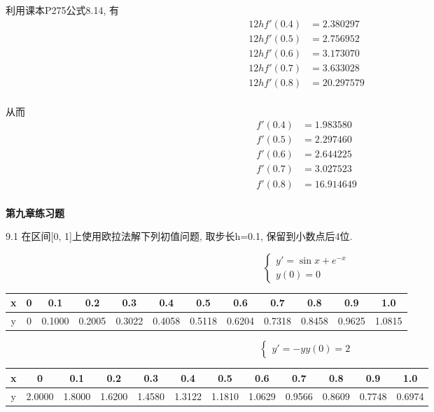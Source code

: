 \documentclass[a4paper, 10pt]{article}
\begin{document}
\begin{CJK}{UTF8}{gbsn}
利用课本P275公式8.14, 有 \\

\begin{align*}
	12hf'(0.4) & =  2.380297 \\
	12hf'(0.5) & =  2.756952 \\
	12hf'(0.6) & =  3.173070 \\
	12hf'(0.7) & =  3.633028 \\
	12hf'(0.8) & = 20.297579 \\
\end{align*}

从而 \\

\begin{align*}
	f'(0.4) & =  1.983580 \\
	f'(0.5) & =  2.297460 \\
	f'(0.6) & =  2.644225 \\
	f'(0.7) & =  3.027523 \\
	f'(0.8) & = 16.914649 \\
\end{align*}

\textbf{第九章练习题}

9.1
在区间[0, 1]上使用欧拉法解下列初值问题, 取步长h=0.1, 保留到小数点后4位.

\begin{equation*}
	\begin{cases}
		y' = \sin{x}+e^{-x} \\
		y(0) = 0
	\end{cases}
\end{equation*}
\begin{tabular}{c|c c c c c c c c c c c}
\hline
x & 0 & 0.1 & 0.2 & 0.3 & 0.4 & 0.5 & 0.6 & 0.7 & 0.8 & 0.9 & 1.0 \\
\hline
y & 0 & 0.1000 & 0.2005 & 0.3022 & 0.4058 & 0.5118 & 0.6204 & 0.7318 & 0.8458 & 0.9625 & 1.0815 \\
\hline
\end{tabular}
\begin{equation*}
	\begin{cases}
		y' = -y
		y(0) = 2
	\end{cases}
\end{equation*}
\begin{tabular}{c|c c c c c c c c c c c}
\hline
x & 0 & 0.1 & 0.2 & 0.3 & 0.4 & 0.5 & 0.6 & 0.7 & 0.8 & 0.9 & 1.0 \\
\hline
y & 2.0000 & 1.8000 & 1.6200 & 1.4580 & 1.3122 & 1.1810 & 1.0629 & 0.9566 & 0.8609 & 0.7748 & 0.6974 \\
\hline
\end{tabular}


\end{CJK}
\end{document}
